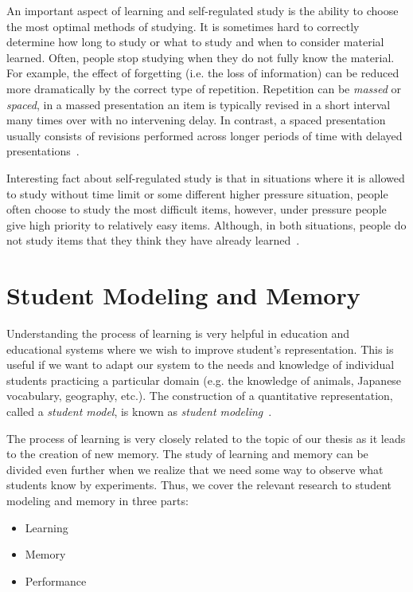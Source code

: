 An important aspect of learning and self-regulated study is the ability to choose the most optimal methods of studying. It is sometimes hard to correctly determine how long to study or what to study and when to consider material learned. Often, people stop studying when they do not fully know the material. For example, the effect of forgetting (i.e. the loss of information) can be reduced more dramatically by the correct type of repetition. Repetition can be \textit{massed} or \textit{spaced}, in a massed presentation an item is typically revised in a short interval many times over with no intervening delay. In contrast, a spaced presentation usually consists of revisions performed across longer periods of time with delayed presentations~\cite{kornell2008learning,pavlik2007optimizing}.

Interesting fact about self-regulated study is that in situations where it is allowed to study without time limit or some different higher pressure situation, people often choose to study the most difficult items, however, under pressure people give high priority to relatively easy items. Although, in both situations, people do not study items that they think they have already learned~\cite{kornell2007promise}.

\section{Student Modeling and Memory}

Understanding the process of learning is very helpful in education and educational systems where we wish to improve student's representation. This is useful if we want to adapt our system to the needs and knowledge of individual students practicing a particular domain (e.g. the knowledge of animals, Japanese vocabulary, geography, etc.). The construction of a quantitative representation, called a \textit{student model}, is known as \textit{student modeling}~\cite{Sison1998}.

The process of learning is very closely related to the topic of our thesis as it leads to the creation of new memory. The study of learning and memory can be divided even further when we realize that we need some way to observe what students know by experiments. Thus, we cover the relevant research to student modeling and memory in three parts:

\begin{itemize}
  \item Learning
  \item Memory
  \item Performance
\end{itemize}


